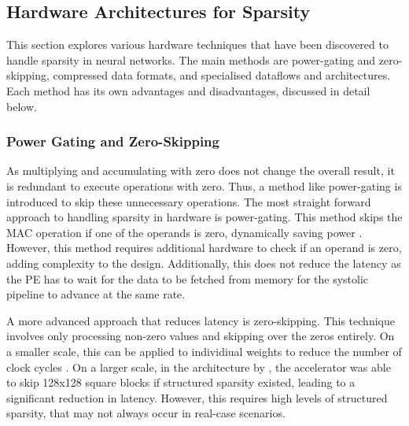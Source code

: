 \documentclass[12pt, a4paper, ukenglish]{article}
\begin{document}
    \subsection{Hardware Architectures for Sparsity} \label{sec: hardware arch spars}
    This section explores various hardware techniques that have been discovered to handle sparsity in neural networks. The main methods are power-gating and zero-skipping, compressed data formats, and specialised dataflows and architectures. Each method has its own advantages and disadvantages, discussed in detail below.
        \subsubsection{Power Gating and Zero-Skipping} \label{sec: power-gating}
        As multiplying and accumulating with zero does not change the overall result, it is redundant to execute operations with zero. Thus, a method like power-gating is introduced to skip these unnecessary operations. The most straight forward approach to handling sparsity in hardware is power-gating. This method skips the MAC operation if one of the operands is zero, dynamically saving power \cite{parashar_scnn_2017}. However, this method requires additional hardware to check if an operand is zero, adding complexity to the design. Additionally, this does not reduce the latency as the PE has to wait for the data to be fetched from memory for the systolic pipeline to advance at the same rate.
        
        A more advanced approach that reduces latency is zero-skipping. This technique involves only processing non-zero values and skipping over the zeros entirely. On a smaller scale, this can be applied to individiual weights to reduce the number of clock cycles \cite{duk_kim_24_2020}. On a larger scale, in the architecture by \textcite{kim_fpga_2021}, the accelerator was able to skip 128x128 square blocks if structured sparsity existed, leading to a significant reduction in latency. However, this requires high levels of structured sparsity, that may not always occur in real-case scenarios.
\end{document}
